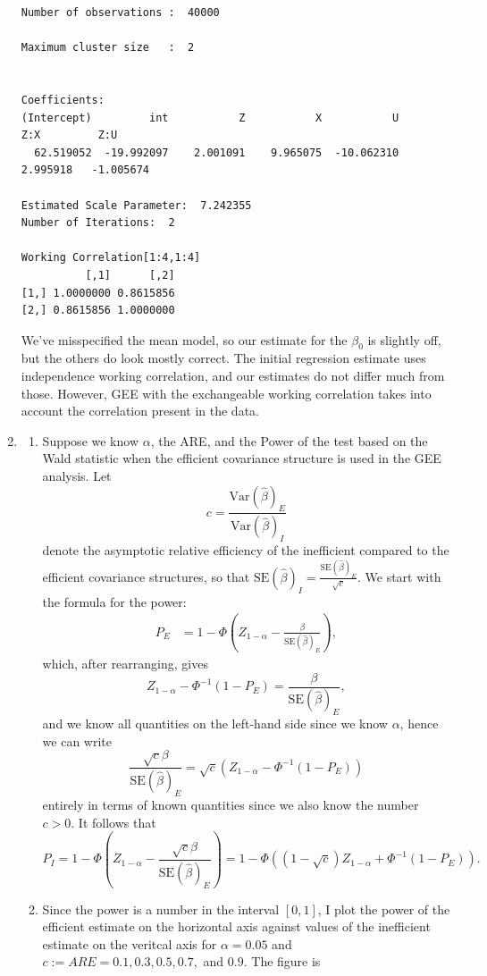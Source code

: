 \documentclass[11pt]{article}
\newcommand{\Var}{\mathrm{Var}}
\begin{document}
\begin{enumerate}
\begin{verbatim}
Number of observations :  40000 

Maximum cluster size   :  2 


Coefficients:
(Intercept)         int           Z           X           U         Z:X         Z:U 
  62.519052  -19.992097    2.001091    9.965075  -10.062310    2.995918   -1.005674 

Estimated Scale Parameter:  7.242355
Number of Iterations:  2

Working Correlation[1:4,1:4]
          [,1]      [,2]
[1,] 1.0000000 0.8615856
[2,] 0.8615856 1.0000000
	\end{verbatim}
	We've misspecified the mean model, so our estimate for the $\beta_0$ is slightly off, but the others do look mostly correct. The initial regression estimate uses independence working correlation, and our estimates do not differ much from those. However, GEE with the exchangeable working correlation takes into account the correlation present in the data.
	\item 
		\begin{enumerate}
			\item Suppose we know $\alpha$, the ARE, and the Power of the test based on the Wald statistic when the efficient covariance structure is used in the GEE analysis. Let 
			\[
				c = \frac{\Var(\widehat{\beta})_E}{\Var(\widehat{\beta})_I}
			\]
			denote the asymptotic relative efficiency of the inefficient compared to the efficient covariance structures, so that $\mathrm{SE}(\widehat{\beta})_I = \frac{\mathrm{SE}(\widehat{\beta})_E}{\sqrt{c}}$. We start with the formula for the power:
			\begin{align*}
				P_E &= 1 - \Phi\left(Z_{1-\alpha} - \frac{\beta}{\mathrm{SE}(\widehat{\beta})_E}\right),
			\end{align*}
			which, after rearranging, gives
			\[
				Z_{1-\alpha} - \Phi^{-1}(1-P_E) = \frac{\beta}{\mathrm{SE}(\widehat{\beta})_E},
			\]
			and we know all quantities on the left-hand side since we know $\alpha$, hence we can write
			\[
				\frac{\sqrt{c}\beta}{\mathrm{SE}(\widehat{\beta})_E} = \sqrt{c}\left(Z_{1-\alpha} - \Phi^{-1}(1-P_E)\right)
			\]
			entirely in terms of known quantities since we also know the number $c>0$. It follows that
			\[
				P_I = 1-\Phi\left(Z_{1-\alpha} - \frac{\sqrt{c}\beta}{\mathrm{SE}(\widehat{\beta})_E}\right) = 1 - \Phi\left(\left(1-\sqrt{c}\right)Z_{1-\alpha} + \Phi^{-1}(1-P_E)\right).
			\]
			\item Since the power is a number in the interval $[0,1]$, I plot the power of the efficient estimate on the horizontal axis against values of the inefficient estimate on the veritcal axis for $\alpha = 0.05$ and $c:=ARE = 0.1,0.3,0.5,0.7,$ and $0.9$. The figure is

\end{enumerate}
\end{enumerate}
\end{document}
